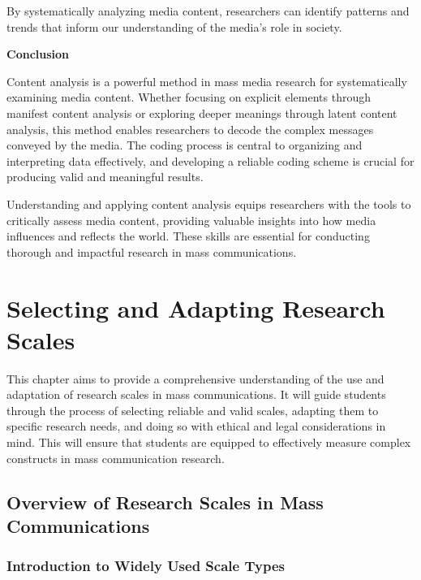 \documentclass[
]{book}
\begin{document}
By systematically analyzing media content, researchers can identify patterns and trends that inform our understanding of the media's role in society.

\textbf{Conclusion}

Content analysis is a powerful method in mass media research for systematically examining media content. Whether focusing on explicit elements through manifest content analysis or exploring deeper meanings through latent content analysis, this method enables researchers to decode the complex messages conveyed by the media. The coding process is central to organizing and interpreting data effectively, and developing a reliable coding scheme is crucial for producing valid and meaningful results.

Understanding and applying content analysis equips researchers with the tools to critically assess media content, providing valuable insights into how media influences and reflects the world. These skills are essential for conducting thorough and impactful research in mass communications.

\chapter{Selecting and Adapting Research Scales}\label{selecting-and-adapting-research-scales}

This chapter aims to provide a comprehensive understanding of the use and adaptation of research scales in mass communications. It will guide students through the process of selecting reliable and valid scales, adapting them to specific research needs, and doing so with ethical and legal considerations in mind. This will ensure that students are equipped to effectively measure complex constructs in mass communication research.

\section*{Overview of Research Scales in Mass Communications}\label{overview-of-research-scales-in-mass-communications}

\subsection*{Introduction to Widely Used Scale Types}\label{introduction-to-widely-used-scale-types}
\end{document}
